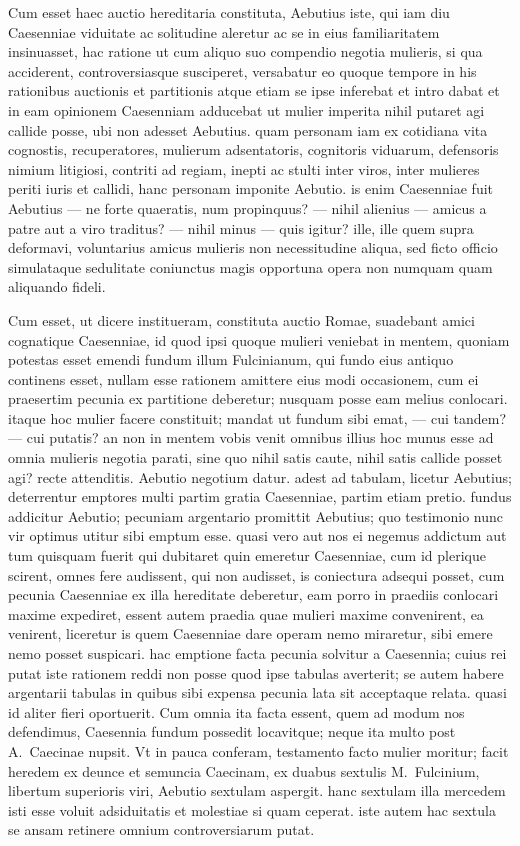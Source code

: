  Cum esset haec auctio hereditaria constituta, Aebutius iste, qui iam diu Caesenniae viduitate ac solitudine aleretur ac se in eius familiaritatem insinuasset, hac ratione ut cum aliquo suo compendio negotia mulieris, si qua acciderent, controversiasque susciperet, versabatur eo quoque tempore in his rationibus auctionis et partitionis atque etiam se ipse inferebat et intro dabat et in eam opinionem Caesenniam adducebat ut mulier imperita nihil putaret agi callide posse, ubi non adesset Aebutius.
 quam personam iam ex cotidiana vita cognostis, recuperatores, mulierum adsentatoris, cognitoris viduarum, defensoris nimium litigiosi, contriti ad regiam, inepti ac stulti inter viros, inter mulieres periti iuris et callidi, hanc personam imponite Aebutio. is enim Caesenniae fuit Aebutius — ne forte quaeratis, num propinquus? — nihil alienius — amicus a patre aut a viro traditus?  — nihil minus — quis igitur? ille, ille quem supra deformavi, voluntarius amicus mulieris non necessitudine aliqua, sed ficto officio simulataque sedulitate coniunctus magis opportuna opera non numquam quam aliquando fideli.

 Cum esset, ut dicere institueram, constituta auctio Romae, suadebant amici cognatique Caesenniae, id quod ipsi quoque mulieri veniebat in mentem, quoniam potestas esset emendi fundum illum Fulcinianum, qui fundo eius antiquo continens esset, nullam esse rationem amittere eius modi occasionem, cum ei praesertim pecunia ex partitione deberetur; nusquam posse eam melius conlocari. itaque hoc mulier facere constituit; mandat ut fundum sibi emat, — cui tandem? — cui putatis? an non in mentem vobis venit omnibus illius hoc munus esse ad omnia mulieris negotia parati, sine quo nihil satis caute, nihil satis callide posset agi?  recte attenditis. Aebutio negotium datur. adest ad tabulam, licetur Aebutius; deterrentur emptores multi partim gratia Caesenniae, partim etiam pretio. fundus addicitur Aebutio; pecuniam argentario promittit Aebutius; quo testimonio nunc vir optimus utitur sibi emptum esse. quasi vero aut nos ei negemus addictum aut tum quisquam fuerit qui dubitaret quin emeretur Caesenniae, cum id plerique scirent, omnes fere audissent, qui non audisset, is coniectura adsequi posset, cum pecunia Caesenniae ex illa hereditate deberetur, eam porro in praediis conlocari maxime expediret, essent autem praedia quae mulieri maxime convenirent, ea venirent, liceretur is quem Caesenniae dare operam nemo miraretur, sibi emere nemo posset suspicari.  hac emptione facta pecunia solvitur a Caesennia; cuius rei putat iste rationem reddi non posse quod ipse tabulas averterit; se autem habere argentarii tabulas in quibus sibi expensa pecunia lata sit acceptaque relata. quasi id aliter fieri oportuerit. Cum omnia ita facta essent, quem ad modum nos defendimus, Caesennia fundum possedit locavitque; neque ita multo post A.~Caecinae nupsit. Vt in pauca conferam, testamento facto mulier moritur; facit heredem ex deunce et semuncia Caecinam, ex duabus sextulis M.~Fulcinium, libertum superioris viri, Aebutio sextulam aspergit. hanc sextulam illa mercedem isti esse voluit adsiduitatis et molestiae si quam ceperat. iste autem hac sextula se ansam retinere omnium controversiarum putat.

